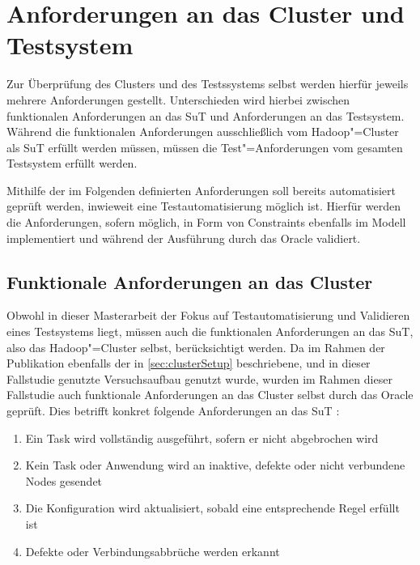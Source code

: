 \section{Anforderungen an das Cluster und Testsystem}
\label{sec:requirements}

Zur Überprüfung des Clusters und des Testssystems selbst werden hierfür jeweils mehrere Anforderungen gestellt.
Unterschieden wird hierbei zwischen funktionalen Anforderungen an das \gls{SuT} und Anforderungen an das Testsystem.
Während die funktionalen Anforderungen ausschließlich vom Hadoop"=Cluster als \gls{SuT} erfüllt werden müssen, müssen die Test"=Anforderungen vom gesamten Testsystem erfüllt werden.

Mithilfe der im Folgenden definierten Anforderungen soll bereits automatisiert geprüft werden, inwieweit eine Testautomatisierung möglich ist.
Hierfür werden die Anforderungen, sofern möglich, in Form von Constraints ebenfalls im Modell implementiert und während der Ausführung durch das Oracle validiert.

\subsection{Funktionale Anforderungen an das Cluster}
\label{subsec:functionalRequirements}

Obwohl in dieser Masterarbeit der Fokus auf Testautomatisierung und Validieren eines Testsystems liegt, müssen auch die funktionalen Anforderungen an das \gls{SuT}, also das Hadoop"=Cluster selbst, berücksichtigt werden.
Da im Rahmen der Publikation \cite{Eberhardinger2018} ebenfalls der in \cref{sec:clusterSetup} beschriebene, und in dieser Fallstudie genutzte Versuchsaufbau genutzt wurde, wurden im Rahmen dieser Fallstudie auch funktionale Anforderungen an das Cluster selbst durch das Oracle geprüft.
Dies betrifft konkret folgende Anforderungen an das \gls{SuT} \cite{Eberhardinger2018}:

\begin{enumerate}
    \item Ein Task wird vollständig ausgeführt, sofern er nicht abgebrochen wird
    \item Kein Task oder Anwendung wird an inaktive, defekte oder nicht verbundene Nodes gesendet
    \item Die Konfiguration wird aktualisiert, sobald eine entsprechende Regel erfüllt ist
    \item Defekte oder Verbindungsabbrüche werden erkannt
\end{enumerate}

